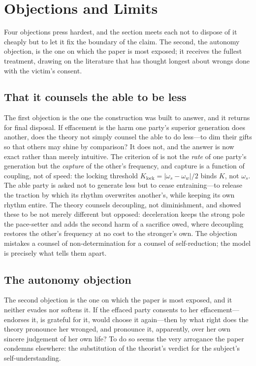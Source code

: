 \section{Objections and Limits}
\label{p18:sec:objections}

\noindent
Four objections press hardest, and the section meets each not to dispose of it cheaply but to let it fix the boundary of the claim. The second, the autonomy objection, is the one on which the paper is most exposed; it receives the fullest treatment, drawing on the literature that has thought longest about wrongs done with the victim's consent.

\subsection{That it counsels the able to be less}
\label{p18:sub:obj-less}
The first objection is the one the construction was built to answer, and it returns for final disposal. If effacement is the harm one party's superior generation does another, does the theory not simply counsel the able to do less---to dim their gifts so that others may shine by comparison? It does not, and the answer is now exact rather than merely intuitive. The criterion of  is not the \emph{rate} of one party's generation but the \emph{capture} of the other's frequency, and capture is a function of coupling, not of speed: the locking threshold $K_{\text{lock}}=|\omega_s-\omega_w|/2$ binds $K$, not $\omega_s$. The able party is asked not to generate less but to cease entraining---to release the traction by which its rhythm overwrites another's, while keeping its own rhythm entire. The theory counsels decoupling, not diminishment, and  showed these to be not merely different but opposed: deceleration keeps the strong pole the pace-setter and adds the second harm of a sacrifice owed, where decoupling restores the other's frequency at no cost to the stronger's own. The objection mistakes a counsel of non-determination for a counsel of self-reduction; the model is precisely what tells them apart.

\subsection{The autonomy objection}
\label{p18:sub:obj-autonomy}
The second objection is the one on which the paper is most exposed, and it neither evades nor softens it. If the effaced party consents to her effacement---endorses it, is grateful for it, would choose it again---then by what right does the theory pronounce her wronged, and pronounce it, apparently, over her own sincere judgement of her own life? To do so seems the very arrogance the paper condemns elsewhere: the substitution of the theorist's verdict for the subject's self-understanding.

